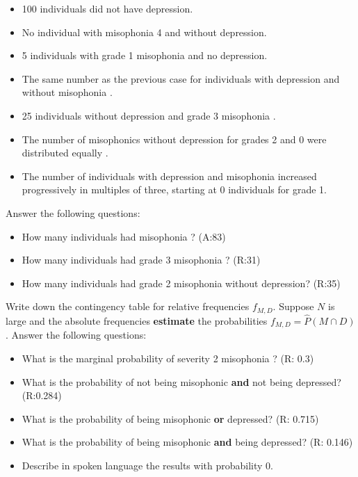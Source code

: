 \documentclass[
]{book}
\providecommand{\tightlist}{%
  \setlength{\itemsep}{0pt}\setlength{\parskip}{0pt}}
\begin{document}
\begin{itemize}
\tightlist
\item
  100 individuals did not have depression.
\item
  No individual with misophonia 4 and without depression.
\item
  5 individuals with grade 1 misophonia and no depression.
\item
  The same number as the previous case for individuals with depression and without misophonia .
\item
  25 individuals without depression and grade 3 misophonia .
\item
  The number of misophonics without depression for grades 2 and 0 were distributed equally .
\item
  The number of individuals with depression and misophonia increased progressively
  in multiples of three, starting at 0 individuals for grade 1.
\end{itemize}

Answer the following questions:

\begin{itemize}
\tightlist
\item
  How many individuals had misophonia ? (A:83)
\item
  How many individuals had grade 3 misophonia ? (R:31)
\item
  How many individuals had grade 2 misophonia without depression? (R:35)
\end{itemize}

Write down the contingency table for relative frequencies \(f_{ M,D }\). Suppose \(N\) is large and the absolute frequencies \textbf{estimate} the probabilities \(f_{ M,D }=\hat {P}(M \cap D)\). Answer the following questions:

\begin{itemize}
\tightlist
\item
  What is the marginal probability of severity 2 misophonia ? (R: 0.3)
\item
  What is the probability of not being misophonic \textbf{and} not being depressed? (R:0.284)
\item
  What is the probability of being misophonic \textbf{or} depressed? (R: 0.715)
\item
  What is the probability of being misophonic \textbf{and} being depressed? (R: 0.146)
\item
  Describe in spoken language the results with probability 0.
\end{itemize}
\end{document}
